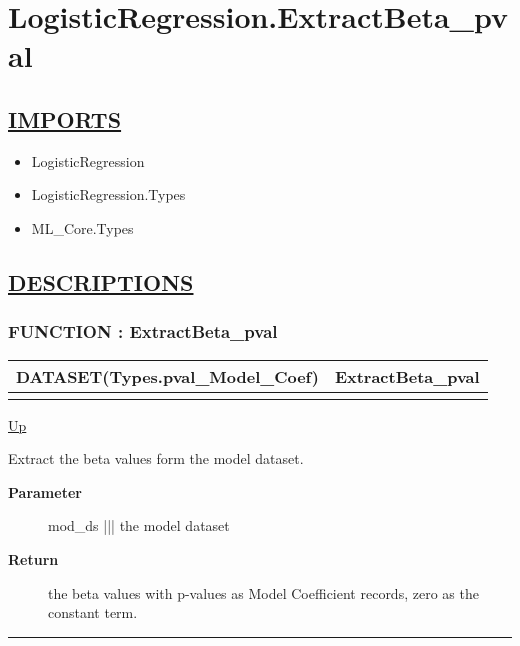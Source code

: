\chapter*{LogisticRegression.ExtractBeta\_pval}
\hypertarget{ecldoc:toc:LogisticRegression.ExtractBeta_pval}{}

\section*{\underline{IMPORTS}}
\begin{itemize}
\item LogisticRegression
\item LogisticRegression.Types
\item ML\_Core.Types
\end{itemize}

\section*{\underline{DESCRIPTIONS}}
\subsection*{FUNCTION : ExtractBeta\_pval}
\hypertarget{ecldoc:logisticregression.extractbeta_pval}{}

{\renewcommand{\arraystretch}{1.5}
\begin{tabularx}{\textwidth}{|>{\raggedright\arraybackslash}l|X|}
\hline
\hspace{0pt}DATASET(Types.pval\_Model\_Coef) & ExtractBeta\_pval \\
\hline
\multicolumn{2}{|>{\raggedright\arraybackslash}X|}{\hspace{0pt}(DATASET(Core\_Types.Layout\_Model) mod\_ds)} \\
\hline
\end{tabularx}
}

\hyperlink{ecldoc:toc:LogisticRegression}{Up}

\par
Extract the beta values form the model dataset.

\par
\begin{description}
\item [\textbf{Parameter}] mod\_ds ||| the model dataset
\item [\textbf{Return}] the beta values with p-values as Model Coefficient records, zero as the constant term.
\end{description}

\rule{\textwidth}{0.4pt}
